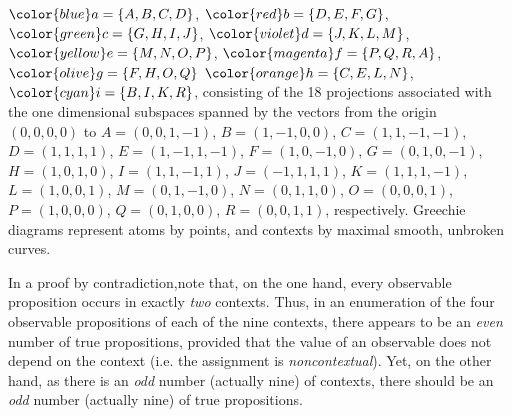 $\color{blue}a=\{A,B,C,D\}$,
$\color{red}b=\{D,E,F,G\}$,
$\color{green}c=\{G,H,I,J\}$,
$\color{violet}d=\{J,K,L,M\}$,
$\color{yellow}e=\{M,N,O,P\}$,
$\color{magenta}f=\{P,Q,R,A\}$,
$\color{olive}g=\{F,H,O,Q\}$
$\color{orange}h=\{C,E,L,N\}$,
$\color{cyan}i=\{B,I,K,R\}$,
consisting of the 18 projections associated with the one dimensional subspaces spanned by  the vectors from the origin $(0,0,0,0)$ to
$ A=(0,0,1,-1)    $,
$ B=(1,-1,0,0)    $,
$ C=(1,1,-1,-1)   $,
$ D=(1,1,1,1)     $,
$  E=(1,-1,1,-1)  $,
$  F=(1,0,-1,0)   $,
$  G=(0,1,0,-1)   $,
$  H=(1,0,1,0)    $,
$  I=(1,1,-1,1)   $,
$ J=(-1,1,1,1)    $,
$ K=(1,1,1,-1)    $,
$ L=(1,0,0,1)     $,
$ M=(0,1,-1,0)    $,
$  N=(0,1,1,0)    $,
$  O=(0,0,0,1)    $,
$  P=(1,0,0,0)    $,
$  Q=(0,1,0,0)    $,
$  R=(0,0,1,1)    $, respectively.
%
Greechie diagrams represent atoms by points, and  contexts by maximal smooth, unbroken curves.

{\color{OliveGreen}\bproof
In a proof by contradiction,note that, on the one hand, every observable proposition occurs in exactly {\em two} contexts.
Thus, in an enumeration of the four observable propositions of each of the nine contexts,
there appears to be an {\em even} number of true propositions,
provided that the value of an observable does not depend on the context (i.e. the assignment is {\em noncontextual}).
Yet, on the other hand, as there is an {\em odd} number (actually nine) of contexts,
there should be an {\em odd} number (actually nine) of true propositions.
\bproof
}





\begin{center}
{\color{olive}   \Huge
 \floweroneleft
}
\end{center}


